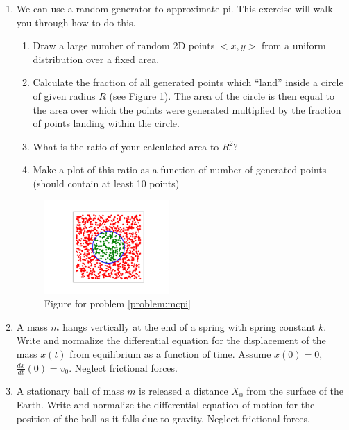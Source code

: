 \documentclass{article}
\begin{document}
\begin{enumerate}
	\item\label{problem:mcpi} We can use a random generator to approximate pi. This exercise will walk you through how to do this. 
	\begin{enumerate}
		\item Draw a large number of random 2D points $<x,y>$ from a uniform distribution over a fixed area. 
		\item Calculate the fraction of all generated points which ``land'' inside a circle of given radius $R$ (see Figure \ref{mcpi}). The area of the circle is then equal to the area over which the points were generated multiplied by the fraction of points landing within the circle.
		\item What is the ratio of your calculated area to $R^2$?
		\item Make a plot of this ratio as a function of number of generated points (should contain at least 10 points)
	\end{enumerate}
	
		\begin{figure}[ht!]
		\centering
		\includegraphics[width=0.45\textwidth]{mc_pi}
		\caption{Figure for problem \ref{problem:mcpi}}
		\label{mcpi}
	\end{figure}

\newpage
\item A mass $m$ hangs vertically at the end of a spring with spring constant $k$.  Write and normalize the differential equation for the displacement of the mass $x(t)$ from equilibrium as a function of time. Assume $x(0)=0$,$\frac{dx}{dt}(0) = v_0$. Neglect frictional forces.

\item A stationary ball of mass $m$ is released a distance $X_0$ from the surface of the Earth. Write and normalize the differential equation of motion for the position of the ball as it falls due to gravity. Neglect frictional forces.
\end{enumerate}
\end{document}
